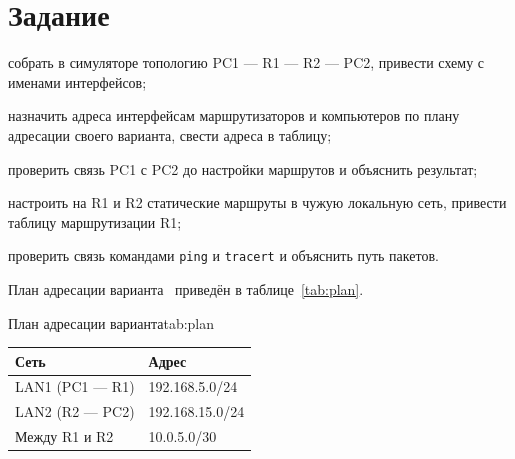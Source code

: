 \section{Задание}
\begin{bbttask}
  \item собрать в симуляторе топологию PC1 — R1 — R2 — PC2, привести схему с именами
  интерфейсов;\label{task:topology}
  \item назначить адреса интерфейсам маршрутизаторов и компьютеров по плану адресации своего
  варианта, свести адреса в таблицу;\label{task:address}
  \item проверить связь PC1 с PC2 до настройки маршрутов и объяснить
  результат;\label{task:before}
  \item настроить на R1 и R2 статические маршруты в чужую локальную сеть, привести таблицу
  маршрутизации R1;\label{task:routes}
  \item проверить связь командами \texttt{ping} и \texttt{tracert} и объяснить путь
  пакетов.\label{task:check}
\end{bbttask}

План адресации варианта~\bbtVariant{} приведён в таблице~\ref{tab:plan}.

\begin{bbttable}{План адресации варианта}{tab:plan}
  \begin{tabular}{|l|l|}
    \hline
    Сеть & Адрес \\ \hline
    LAN1 (PC1 — R1) & 192.168.5.0/24 \\ \hline
    LAN2 (R2 — PC2) & 192.168.15.0/24 \\ \hline
    Между R1 и R2 & 10.0.5.0/30 \\ \hline
  \end{tabular}
\end{bbttable}

